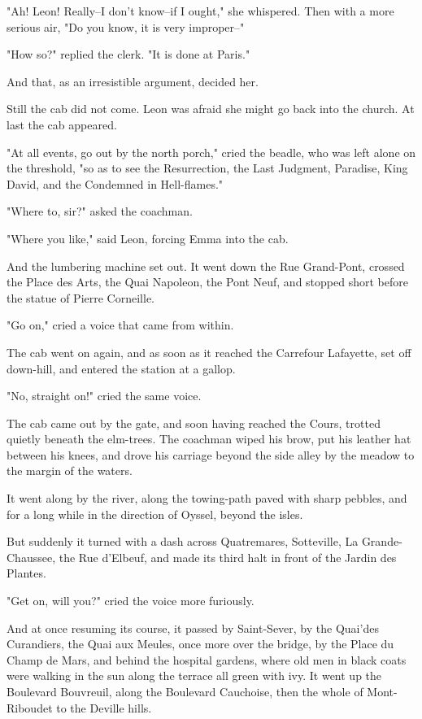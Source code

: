 \documentclass[11pt,twocolumn]{ltugboat}
\begin{document}
"Ah! Leon! Really--I don't know--if I ought," she whispered. Then with a
more serious air, "Do you know, it is very improper--"

"How so?" replied the clerk. "It is done at Paris."

And that, as an irresistible argument, decided her.

Still the cab did not come. Leon was afraid she might go back into the
church. At last the cab appeared.

"At all events, go out by the north porch," cried the beadle, who was
left alone on the threshold, "so as to see the Resurrection, the Last
Judgment, Paradise, King David, and the Condemned in Hell-flames."

"Where to, sir?" asked the coachman.

"Where you like," said Leon, forcing Emma into the cab.

And the lumbering machine set out. It went down the Rue Grand-Pont,
crossed the Place des Arts, the Quai Napoleon, the Pont Neuf, and
stopped short before the statue of Pierre Corneille.

"Go on," cried a voice that came from within.

The cab went on again, and as soon as it reached the Carrefour
Lafayette, set off down-hill, and entered the station at a gallop.

"No, straight on!" cried the same voice.

The cab came out by the gate, and soon having reached the Cours, trotted
quietly beneath the elm-trees. The coachman wiped his brow, put his
leather hat between his knees, and drove his carriage beyond the side
alley by the meadow to the margin of the waters.

It went along by the river, along the towing-path paved with sharp
pebbles, and for a long while in the direction of Oyssel, beyond the
isles.

But suddenly it turned with a dash across Quatremares, Sotteville, La
Grande-Chaussee, the Rue d'Elbeuf, and made its third halt in front of
the Jardin des Plantes.

"Get on, will you?" cried the voice more furiously.

And at once resuming its course, it passed by Saint-Sever, by the
Quai'des Curandiers, the Quai aux Meules, once more over the bridge, by
the Place du Champ de Mars, and behind the hospital gardens, where old
men in black coats were walking in the sun along the terrace all green
with ivy. It went up the Boulevard Bouvreuil, along the Boulevard
Cauchoise, then the whole of Mont-Riboudet to the Deville hills.
\end{document}
